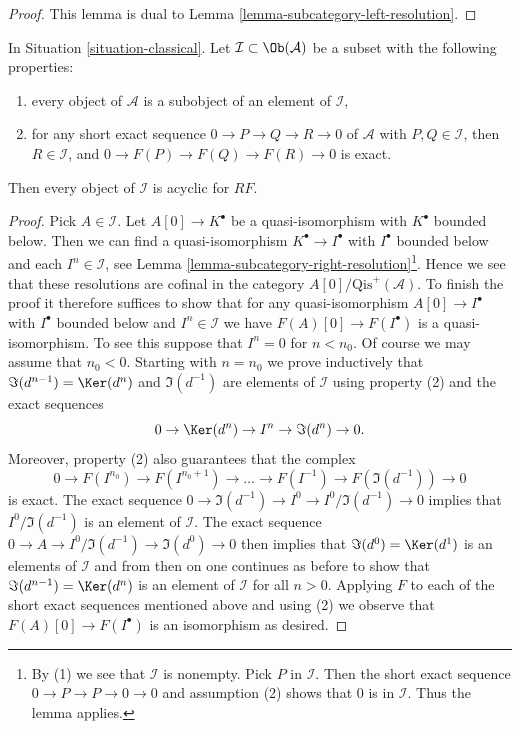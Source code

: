 \begin{proof}
This lemma is dual to Lemma \ref{lemma-subcategory-left-resolution}.
\end{proof}

\begin{lemma}
\label{lemma-subcategory-right-acyclics}
In
Situation \ref{situation-classical}.
Let $\mathcal{I} \subset \Ob(\mathcal{A})$ be a subset with the
following properties:
\begin{enumerate}
\item every object of $\mathcal{A}$ is a subobject of an element of
$\mathcal{I}$,
\item for any short exact sequence $0 \to P \to Q \to R \to 0$ of
$\mathcal{A}$ with $P, Q \in \mathcal{I}$, then $R \in \mathcal{I}$,
and $0 \to F(P) \to F(Q) \to F(R) \to 0$ is exact.
\end{enumerate}
Then every object of $\mathcal{I}$ is acyclic for $RF$.
\end{lemma}

\begin{proof}
Pick $A \in \mathcal{I}$. Let $A[0] \to K^\bullet$
be a quasi-isomorphism with $K^\bullet$
bounded below. Then we can find a quasi-isomorphism
$K^\bullet \to I^\bullet$ with $I^\bullet$ bounded below and
each $I^n \in \mathcal{I}$, see
Lemma \ref{lemma-subcategory-right-resolution}\footnote{By (1)
we see that $\mathcal{I}$ is nonempty. Pick $P$ in $\mathcal{I}$.
Then the short exact sequence $0 \to P \to P \to 0 \to 0$ and assumption (2)
shows that $0$ is in $\mathcal{I}$. Thus the lemma applies.}.
Hence we see that these resolutions are cofinal in the category
$A[0]/\text{Qis}^{+}(\mathcal{A})$. To finish the proof it therefore
suffices to show that for any quasi-isomorphism
$A[0] \to I^\bullet$ with $I^\bullet$ bounded below and $I^n \in \mathcal{I}$
we have $F(A)[0] \to F(I^\bullet)$ is a quasi-isomorphism.
To see this suppose that $I^n = 0$ for $n < n_0$. Of course we may assume
that $n_0 < 0$. Starting with $n = n_0$ we prove inductively that
$\Im(d^{n - 1}) = \Ker(d^n)$ and $\Im(d^{-1})$
are elements of $\mathcal{I}$ using property (2) and the exact sequences
$$
0 \to \Ker(d^n) \to I^n \to \Im(d^n) \to 0.
$$
Moreover, property (2) also guarantees that the complex
$$
0 \to F(I^{n_0}) \to F(I^{n_0 + 1}) \to \ldots \to F(I^{-1}) \to
F(\Im(d^{-1})) \to 0
$$
is exact. The exact sequence
$0 \to \Im(d^{-1}) \to I^0 \to I^0/\Im(d^{-1}) \to 0$
implies that $I^0/\Im(d^{-1})$ is an element of $\mathcal{I}$.
The exact sequence $0 \to A \to I^0/\Im(d^{-1}) \to \Im(d^0) \to 0$
then implies that $\Im(d^0) = \Ker(d^1)$ is an elements of
$\mathcal{I}$ and from then on one continues as before to show that
$\Im(d^{n - 1}) = \Ker(d^n)$ is an element of $\mathcal{I}$
for all $n > 0$. Applying $F$ to each of the short exact sequences
mentioned above and using (2) we observe that $F(A)[0] \to F(I^\bullet)$
is an isomorphism as desired.
\end{proof}

